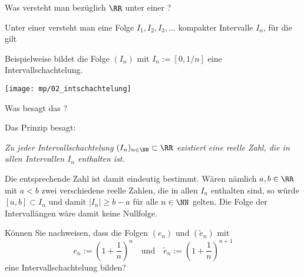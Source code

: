 \begin{frage}%
  \label{02_ints}
  Was versteht man bezüglich $\RR$ unter einer 
  ?
\end{frage}

\begin{antwort}[]
  \Ant Unter einer  versteht man eine Folge 
  $I_1,I_2,I_3,\ldots$ 
  kompakter Intervalle $I_n$, für die gilt

  \noindent
  Beispielweise bildet die Folge $(I_n)$ mit $I_n := [ 0, 1/n ]$ eine 
  Intervallschachtelung.
  \AntEnd

  \begin{center}
    \texttt{[image: mp/02\_intschachtelung]}
    \label{fig:02_intschachtelung}
  \end{center}
\end{antwort}

\begin{frage}%
  \label{02_intp}
  Was besagt das ?
\end{frage}

\begin{antwort}
  Das Prinzip besagt: 

  \medskip%
  \noindent%
  \textit{Zu jeder Intervallschachtelung 
    $(I_n)_{n\in\NN} \subset \RR$ existiert eine 
    reelle Zahl, die in allen Intervallen $I_n$ enthalten ist.}

  \medskip\noindent
  Die entsprechende Zahl ist damit eindeutig bestimmt. 
  Wären nämlich $a,b\in\RR$ mit $a<b$ zwei verschiedene reelle Zahlen, die 
  in allen $I_n$ enthalten sind, so würde $[ a,b ] \subset I_n$ und damit 
  $|I_n| \ge b-a$ für alle $n\in\NN$ gelten. Die Folge der Intervallängen 
  wäre damit keine Nullfolge.
  \AntEnd
\end{antwort}

\begin{frage}%
  \label{02_ein}
  Können Sie nachweisen, dass die Folgen $(e_n)$ und $(\widetilde{e}_n)$ mit 
  \[
  e_n := \left( 1+\frac{1}{n} \right)^n \quad\text{und}\quad
  \widetilde{e}_n :=  \left( 1+\frac{1}{n} \right)^{n+1}
  \]
  eine Intervallschachtelung bilden?
\end{frage}

